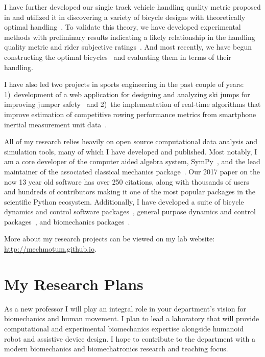 \documentclass{article}
\begin{document}
I have further developed our single track vehicle handling quality metric
proposed in \cite{Hess2012} and utilized it in discovering a variety of bicycle
designs with theoretically optimal handling~\cite{Moore2016,Moore2019a}. To
validate this theory, we have developed experimental methods with preliminary
results indicating a likely relationship in the handling quality metric and
rider subjective ratings~\cite{Kresie2017}. And most recently, we have begun
constructing the optimal bicycles~\cite{Gilboa2019a} and evaluating them in
terms of their handling.

I have also led two projects in sports engineering in the past couple of years:
1)~development of a web application for designing and analyzing ski jumps for
improving jumper safety~\cite{Moore2018a,Cloud2019a} and 2)~the implementation
of real-time algorithms that improve estimation of competitive rowing
performance metrics from smartphone inertial measurement unit
data~\cite{Cloud2019b}.

All of my research relies heavily on open source computational data analysis
and simulation tools, many of which I have developed and published. Most
notably, I am a core developer of the computer aided algebra system,
SymPy~\cite{SymPyDevelopmentTeam2006}, and the lead maintainer of the
associated classical mechanics package~\cite{Gede2013}. Our 2017 paper
\cite{Meurer2017} on the now 13 year old software has over 250 citations, along
with thousands of users and hundreds of contributors making it one of the most
popular packages in the scientific Python ecosystem. Additionally, I have
developed a suite of bicycle dynamics and control software
packages~\cite{Moore2010b,Moore2011d,Moore2011a,Moore2011e}, general purpose
dynamics and control packages~\cite{Moore2014,Moore2011}, and biomechanics
packages~\cite{Dembia2011,Moore2011,Moore2011b,Moore2013b}.

More about my research projects can be viewed on my lab website:
\url{http://mechmotum.github.io}.

\section*{My Research Plans%
  \label{my-research-plans}%
}

As a new professor I will play an integral role in your department's vision for
biomechanics and human movement. I plan to lead a laboratory that will provide
computational and experimental biomechanics expertise alongside humanoid robot
and assistive device design. I hope to contribute to the department with a
modern biomechanics and biomechatronics research and teaching focus.
\end{document}
